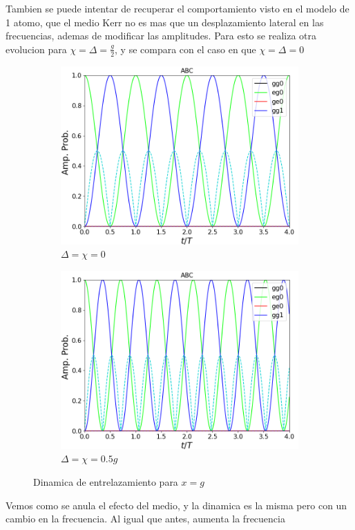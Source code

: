 Tambien se puede intentar de recuperar el comportamiento visto en el modelo de 1 atomo, que el medio Kerr no es mas que un desplazamiento lateral en las frecuencias, ademas de modificar las amplitudes. Para esto se realiza otra evolucion para $\chi=\Delta=\frac{g}{2}$, y se compara con el caso en que $\chi=\Delta=0$
\begin{figure}[h]
    \centering
    \begin{subfigure}{0.49\textwidth}
        \includegraphics[width=\textwidth]{figuras/ch4/d=x=0 eg0 abc.png}
        \caption{$\Delta=\chi=0$}
        \label{fig4:comparacion kerr pob 1}
    \end{subfigure}
    \hfill
    \begin{subfigure}{0.49\textwidth}
        \includegraphics[width=\textwidth]{figuras/ch4/d=x=0.5 eg0 abc.png}
        \caption{$\Delta=\chi=0.5g$}
        \label{fig4:comparacion ker pob 2}
    \end{subfigure}
    \caption{Dinamica de entrelazamiento para $x=g$}
    \label{fig4:comparacion d vs x}
\end{figure}
Vemos como se anula el efecto del medio, y la dinamica es la misma pero con un cambio en la frecuencia. Al igual que antes, aumenta la frecuencia

